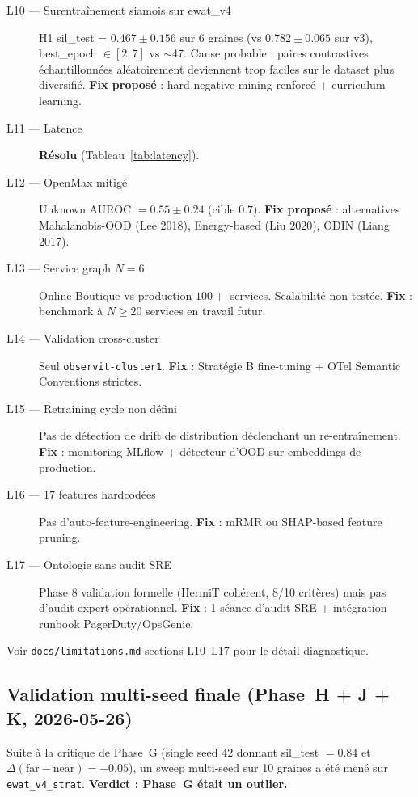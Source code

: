 \begin{description}
  \item[L10 --- Surentraînement siamois sur ewat\_v4] H1 sil\_test = $0.467 \pm 0.156$
    sur 6 graines (vs $0.782 \pm 0.065$ sur v3), best\_epoch $\in [2, 7]$ vs $\sim$47.
    Cause probable : paires contrastives échantillonnées aléatoirement deviennent
    trop faciles sur le dataset plus diversifié.
    \textbf{Fix proposé} : hard-negative mining renforcé + curriculum learning.
  \item[L11 --- Latence] \textbf{Résolu} (Tableau~\ref{tab:latency}).
  \item[L12 --- OpenMax mitigé] Unknown AUROC $= 0.55 \pm 0.24$ (cible $0.7$).
    \textbf{Fix proposé} : alternatives Mahalanobis-OOD (Lee 2018), Energy-based
    (Liu 2020), ODIN (Liang 2017).
  \item[L13 --- Service graph $N=6$] Online Boutique vs production $100+$ services.
    Scalabilité non testée. \textbf{Fix} : benchmark à $N \geq 20$ services en travail futur.
  \item[L14 --- Validation cross-cluster] Seul \texttt{observit-cluster1}.
    \textbf{Fix} : Stratégie B fine-tuning + OTel Semantic Conventions strictes.
  \item[L15 --- Retraining cycle non défini] Pas de détection de drift de distribution
    déclenchant un re-entraînement. \textbf{Fix} : monitoring MLflow + détecteur d'OOD sur
    embeddings de production.
  \item[L16 --- 17 features hardcodées] Pas d'auto-feature-engineering. \textbf{Fix} :
    mRMR ou SHAP-based feature pruning.
  \item[L17 --- Ontologie sans audit SRE] Phase 8 validation formelle (HermiT cohérent,
    8/10 critères) mais pas d'audit expert opérationnel. \textbf{Fix} : 1 séance d'audit SRE
    + intégration runbook PagerDuty/OpsGenie.
\end{description}

Voir \texttt{docs/limitations.md} sections L10--L17 pour le détail diagnostique.

\subsection{Validation multi-seed finale (Phase~H + J + K, 2026-05-26)}
\label{sec:multiseed}

Suite à la critique de Phase~G (single seed $42$ donnant sil\_test $= 0.84$ et
$\Delta(\text{far}-\text{near}) = -0.05$), un sweep multi-seed sur 10 graines a
été mené sur \texttt{ewat\_v4\_strat}. \textbf{Verdict : Phase~G était un
outlier.}

